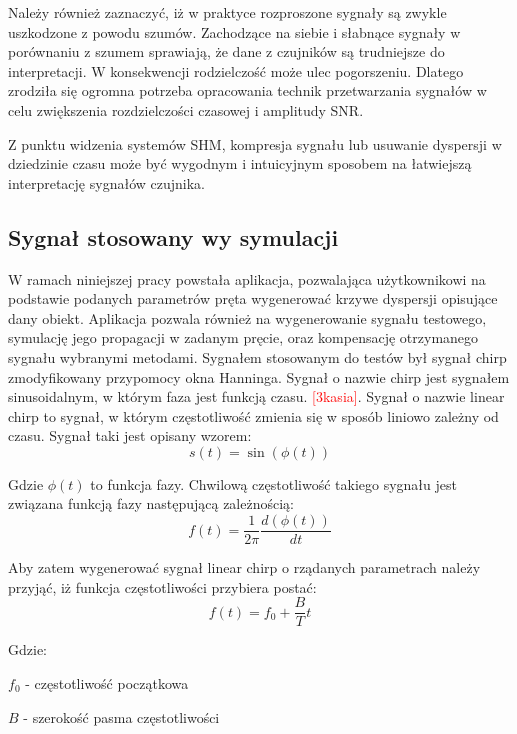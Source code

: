 Należy również zaznaczyć, iż w praktyce rozproszone sygnały są zwykle uszkodzone z powodu szumów. Zachodzące na siebie i słabnące sygnały w porównaniu z szumem sprawiają, że dane z czujników są trudniejsze do interpretacji. W konsekwencji rodzielczość może ulec pogorszeniu. Dlatego zrodziła się ogromna potrzeba opracowania technik przetwarzania sygnałów w celu zwiększenia rozdzielczości czasowej i amplitudy SNR.

Z punktu widzenia systemów SHM, kompresja sygnału lub usuwanie dyspersji w dziedzinie czasu może być wygodnym i intuicyjnym sposobem na łatwiejszą interpretację sygnałów czujnika.

\subsection{Sygnał stosowany wy symulacji}
W ramach niniejszej pracy powstała aplikacja, pozwalająca użytkownikowi na podstawie podanych parametrów pręta wygenerować krzywe dyspersji opisujące dany obiekt. Aplikacja pozwala również na wygenerowanie sygnału testowego, symulację jego propagacji w zadanym pręcie, oraz kompensację otrzymanego sygnału wybranymi metodami. Sygnałem stosowanym do testów był sygnał chirp zmodyfikowany przypomocy okna Hanninga.
	Sygnał o nazwie chirp jest sygnałem sinusoidalnym, w którym faza jest funkcją czasu. \textcolor{red}{[3kasia]}. Sygnał o nazwie linear chirp to sygnał, w którym częstotliwość zmienia się w sposób liniowo zależny od czasu. Sygnał taki jest opisany wzorem:
	\begin{equation}
	s(t) = \sin(\phi (t))
	\end{equation}
	
	Gdzie $\phi (t)$ to funkcja fazy. Chwilową częstotliwość takiego sygnału jest związana funkcją fazy następującą zależnością:
	\begin{equation}
	f(t) = \frac{1}{2\pi}\frac{d(\phi (t))}{dt} \label{eq:f(t)_z_phi}
	\end{equation}
	
	Aby zatem wygenerować sygnał linear chirp o rządanych parametrach należy przyjąć, iż funkcja częstotliwości przybiera postać:
	\begin{equation}
	f(t) = f_0+\frac{B}{T}t \label{eq:f(t)_liniowo}
	\end{equation}
	
	Gdzie:
	
	$f_0$ - częstotliwość początkowa
	
	$B$ - szerokość pasma częstotliwości
	
